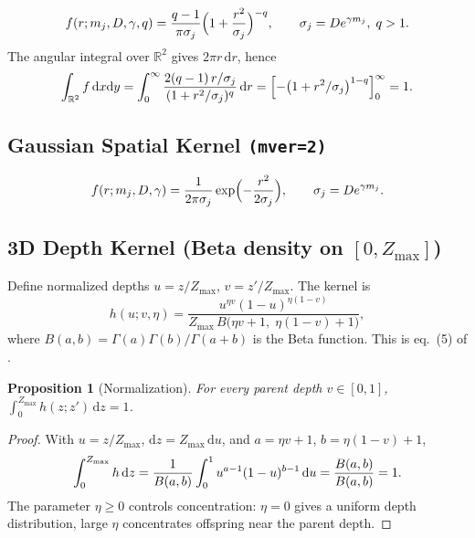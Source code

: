 \documentclass[11pt,a4paper]{article}
\theoremstyle{plain}
\newtheorem{proposition}{Proposition}
\theoremstyle{definition}
\newcommand{\Zmax}{Z_{\max}}
\newcommand{\sigj}{\sigma_j}
\newcommand{\R}{\mathbb{R}}
\newcommand{\dd}{\mathrm{d}}
\begin{document}
\begin{equation}\label{eq:pl-kernel}
f(r; m_j,D,\gamma,q)
= \frac{q-1}{\pi\sigj}\Bigl(1+\frac{r^2}{\sigj}\Bigr)^{-q},
\qquad \sigj = D e^{\gamma m_j},\; q>1.
\end{equation}
The angular integral over $\R^2$ gives $2\pi r\,\dd r$, hence
\begin{equation}\label{eq:pl-norm}
\int_{\R^2} f\,\dd x\dd y
= \int_0^\infty \frac{2(q-1)\,r/\sigj}{(1+r^2/\sigj)^q}\,\dd r
= \Bigl[-\bigl(1+r^2/\sigj\bigr)^{1-q}\Bigr]_0^\infty = 1.
\end{equation}

\subsection{Gaussian Spatial Kernel \texttt{(mver=2)}}\label{sec:gauss-kernel}

\begin{equation}\label{eq:gauss-kernel}
f(r; m_j,D,\gamma)
= \frac{1}{2\pi\sigj}\exp\Bigl(-\frac{r^2}{2\sigj}\Bigr),
\qquad \sigj = D e^{\gamma m_j}.
\end{equation}

\subsection{3D Depth Kernel (Beta density on $[0,\Zmax]$)}\label{sec:depth-kernel}

Define normalized depths $u=z/\Zmax$, $v=z'/\Zmax$. The kernel is
\begin{equation}\label{eq:depth-kernel}
h(u;v,\eta) =
\frac{u^{\eta v}(1-u)^{\eta(1-v)}}
     {\Zmax\, B\bigl(\eta v+1,\;\eta(1-v)+1\bigr)},
\end{equation}
where $B(a,b)=\Gamma(a)\Gamma(b)/\Gamma(a+b)$ is the Beta function. This is
eq.~(5) of \cite{GZZ15}.

\begin{proposition}[Normalization]\label{prop:depth-norm}
For every parent depth $v\in[0,1]$, $\int_0^{\Zmax} h(z;z')\,\dd z = 1$.
\end{proposition}
\begin{proof}
With $u=z/\Zmax$, $\dd z=\Zmax\,\dd u$, and $a=\eta v+1$, $b=\eta(1-v)+1$,
\[
\int_0^{\Zmax} h\,\dd z
= \frac{1}{B(a,b)}\int_0^1 u^{a-1}(1-u)^{b-1}\,\dd u
= \frac{B(a,b)}{B(a,b)} = 1. \qedhere
\]
The parameter $\eta\ge 0$ controls concentration: $\eta=0$ gives a uniform
depth distribution, large $\eta$ concentrates offspring near the parent depth.
\end{proof}
\end{document}
